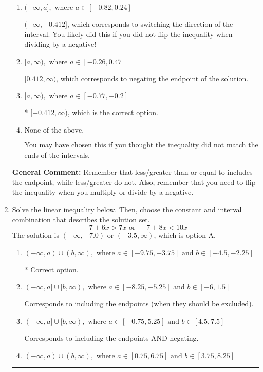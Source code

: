 \documentclass{extbook}[14pt]
\newcommand{\litem}[1]{\item #1

\rule{\textwidth}{0.4pt}}
\begin{document}
\begin{enumerate}
{\begin{enumerate}[label=\Alph*.]
 $(-\infty, 0.412]$, which corresponds to switching the direction of the interval AND negating the endpoint. You likely did this if you did not flip the inequality when dividing by a negative as well as not moving values over to a side properly.
\item \( (-\infty, a], \text{ where } a \in [-0.82, 0.24] \)

 $(-\infty, -0.412]$, which corresponds to switching the direction of the interval. You likely did this if you did not flip the inequality when dividing by a negative!
\item \( [a, \infty), \text{ where } a \in [-0.26, 0.47] \)

 $[0.412, \infty)$, which corresponds to negating the endpoint of the solution.
\item \( [a, \infty), \text{ where } a \in [-0.77, -0.2] \)

* $[-0.412, \infty)$, which is the correct option.
\item \( \text{None of the above}. \)

You may have chosen this if you thought the inequality did not match the ends of the intervals.
\end{enumerate}

\textbf{General Comment:} Remember that less/greater than or equal to includes the endpoint, while less/greater do not. Also, remember that you need to flip the inequality when you multiply or divide by a negative.
}
\litem{
Solve the linear inequality below. Then, choose the constant and interval combination that describes the solution set.
\[ -7 + 6 x > 7 x \text{ or } -7 + 8 x < 10 x \]The solution is \( (-\infty, -7.0) \text{ or } (-3.5, \infty) \), which is option A.\begin{enumerate}[label=\Alph*.]
\item \( (-\infty, a) \cup (b, \infty), \text{ where } a \in [-9.75, -3.75] \text{ and } b \in [-4.5, -2.25] \)

 * Correct option.
\item \( (-\infty, a] \cup [b, \infty), \text{ where } a \in [-8.25, -5.25] \text{ and } b \in [-6, 1.5] \)

Corresponds to including the endpoints (when they should be excluded).
\item \( (-\infty, a] \cup [b, \infty), \text{ where } a \in [-0.75, 5.25] \text{ and } b \in [4.5, 7.5] \)

Corresponds to including the endpoints AND negating.
\item \( (-\infty, a) \cup (b, \infty), \text{ where } a \in [0.75, 6.75] \text{ and } b \in [3.75, 8.25] \)


\end{enumerate}}
\end{enumerate}
\end{document}
